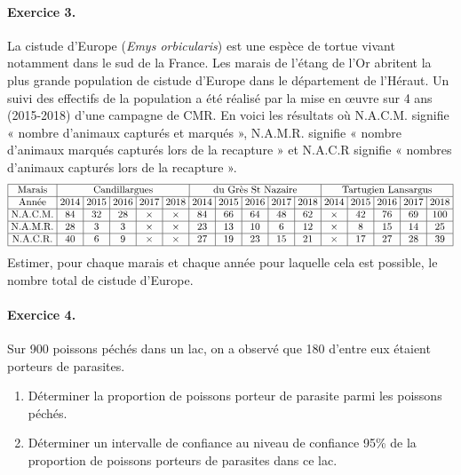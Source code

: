\documentclass[11pt]{article}
\begin{document}
\paragraph{Exercice 3.} La cistude d’Europe (\emph{Emys orbicularis}) est une
espèce de tortue vivant notamment
dans le sud de la France. Les marais de l’étang de l’Or abritent la plus grande population de
cistude d’Europe dans le département de l’Héraut. Un suivi des effectifs de la population a
été réalisé par la mise en œuvre sur 4 ans (2015-2018) d’une campagne de CMR. En voici les
résultats où N.A.C.M. signifie « nombre d’animaux capturés et marqués », N.A.M.R. signifie
« nombre d’animaux marqués capturés lors de la recapture » et N.A.C.R signifie « nombres
d’animaux capturés lors de la recapture ».
\[
  \arraycolsep=3pt
  \begin{array}{|c|c|c|c|c|c|c|c|c|c|c|c|c|c|c|c|}
    \hline
    \text{Marais} & \multicolumn{5}{c}{\text{Candillargues}} &
    \multicolumn{5}{|c|}{\text{du Grès St Nazaire}} & \multicolumn{5}{c|}{\text{Tartugien
    Lansargus}} \\
    \hline
    \text{Année} & 2014 & 2015 & 2016 & 2017 & 2018 &
    2014 & 2015 & 2016 & 2017 & 2018 &
    2014 & 2015 & 2016 & 2017 & 2018 \\
    \hline
  \text{N.A.C.M.} & 84 & 32 & 28 & \times &
    \times & 84 & 66 & 64 & 48 & 62 &
    \times & 42 & 76 & 69 & 100\\
    \hline
    \text{N.A.M.R.} & 28 & 3 & 3 & \times & \times & 23 & 13 & 10 & 6 & 12 &
    \times & 8 & 15 & 14 &
    25 \\
    \hline
    \text{N.A.C.R.} & 40 & 6 & 9 & \times & \times & 27 & 19 & 23 & 15 & 21 &
    \times & 17 & 27 & 28 &
    39\\
    \hline
  \end{array}
\]
Estimer, pour chaque marais et chaque année pour laquelle cela est possible, le
nombre total de cistude d'Europe.

\paragraph{Exercice 4.} Sur 900 poissons péchés dans un lac, on a observé que 180 d’entre eux étaient
porteurs de parasites.
\begin{enumerate}
  \item Déterminer la proportion de poissons porteur de parasite parmi les
    poissons péchés.
  \item Déterminer un intervalle de confiance au niveau de confiance 95\% de la proportion de
poissons porteurs de parasites dans ce lac.
\end{enumerate}
\end{document}
